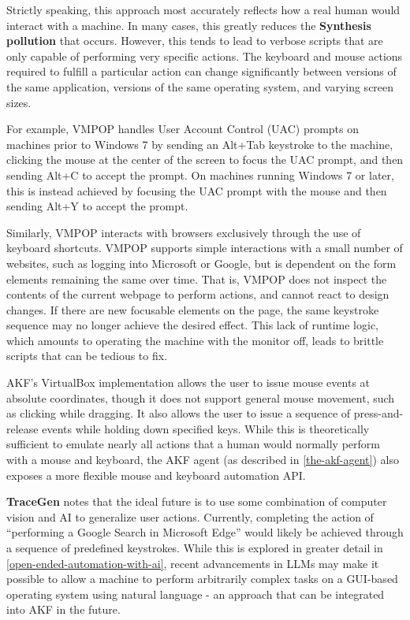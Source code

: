 Strictly speaking, this approach most accurately reflects how a real
human would interact with a machine. In many cases, this greatly reduces
the \textbf{Synthesis pollution} that occurs. However, this tends to
lead to verbose scripts that are only capable of performing very
specific actions. The keyboard and mouse actions required to fulfill a
particular action can change significantly between versions of the same
application, versions of the same operating system, and varying screen
sizes.

For example, VMPOP handles User Account Control (UAC) prompts on
machines prior to Windows 7 by sending an Alt+Tab keystroke to the
machine, clicking the mouse at the center of the screen to focus the UAC
prompt, and then sending Alt+C to accept the prompt. On machines running
Windows 7 or later, this is instead achieved by focusing the UAC prompt
with the mouse and then sending Alt+Y to accept the prompt.

Similarly, VMPOP interacts with browsers exclusively through the use of
keyboard shortcuts. VMPOP supports simple interactions with a small
number of websites, such as logging into Microsoft or Google, but is
dependent on the form elements remaining the same over time. That is,
VMPOP does not inspect the contents of the current webpage to perform
actions, and cannot react to design changes. If there are new focusable
elements on the page, the same keystroke sequence may no longer achieve
the desired effect. This lack of runtime logic, which amounts to
operating the machine with the monitor off, leads to brittle scripts
that can be tedious to fix.

AKF's VirtualBox implementation allows the user to issue mouse events at
absolute coordinates, though it does not support general mouse movement,
such as clicking while dragging. It also allows the user to issue a
sequence of press-and-release events while holding down specified keys.
While this is theoretically sufficient to emulate nearly all actions
that a human would normally perform with a mouse and keyboard, the AKF
agent (as described in \autoref{the-akf-agent}) also exposes a more flexible mouse and keyboard automation API.

\textbf{TraceGen} notes that the ideal future is to use some combination
of computer vision and AI to generalize user actions. Currently,
completing the action of ``performing a Google Search in Microsoft
Edge'' would likely be achieved through a sequence of predefined
keystrokes. While this is explored in greater detail in \autoref{open-ended-automation-with-ai}, recent advancements
in LLMs may make it possible to allow a machine to perform arbitrarily
complex tasks on a GUI-based operating system using natural language -
an approach that can be integrated into AKF in the future.


